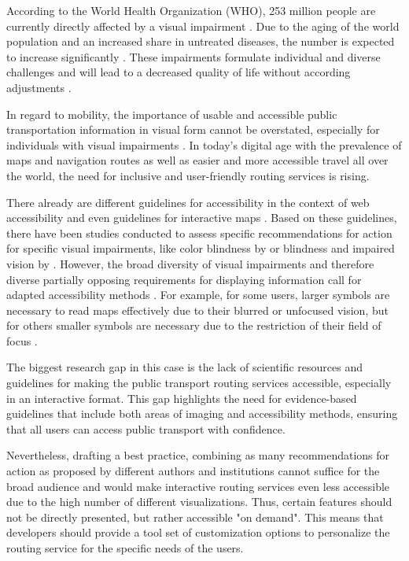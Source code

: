 \documentclass[agile, final]{copernicus-agile}
\begin{document}

\introduction[Introduction]

According to the World Health Organization (WHO), 253 million people are currently directly affected by a visual impairment \citep{WHO2023}. Due to the aging of the world population and an increased share in untreated diseases, the number is expected to increase significantly \citep{WHO2019}. These impairments formulate individual and diverse challenges and will lead to a decreased quality of life without according adjustments \citep{WHO2019}.

In regard to mobility, the importance of usable and accessible public transportation information in visual form cannot be overstated, especially for individuals with visual impairments \citep{EngelEA2022, NeuschmidEA2012, Sennekamp2022}. In today’s digital age with the prevalence of maps and navigation routes as well as easier and more accessible travel all over the world, the need for inclusive and user-friendly routing services is rising.

There already are different guidelines for accessibility in the context of web accessibility and even guidelines for interactive maps \citep{W3C2012, W3C2023, MinnesotaIT2023}. Based on these guidelines, there have been studies conducted to assess specific recommendations for action for specific visual impairments, like color blindness by \citet{JennyKelso2007} or blindness and impaired vision by \citet{EngelEA2022}. However, the broad diversity of visual impairments and therefore diverse partially opposing requirements for displaying information call for adapted accessibility methods \citep{NeuschmidEA2012}. For example, for some users, larger symbols are necessary to read maps effectively due to their blurred or unfocused vision, but for others smaller symbols are necessary due to the restriction of their field of focus \citep{NeuschmidEA2012}. 

The biggest research gap in this case is the lack of scientific resources and guidelines for making the public transport routing services accessible, especially in an interactive format. This gap highlights the need for evidence-based guidelines that include both areas of imaging and accessibility methods, ensuring that all users can access public transport with confidence.

Nevertheless, drafting a best practice, combining as many recommendations for action as proposed by different authors and institutions cannot suffice for the broad audience and would make interactive routing services even less accessible due to the high number of different visualizations. Thus, certain features should not be directly presented, but rather accessible "on demand". This means that developers should provide a tool set of customization options to personalize the routing service for the specific needs of the users. 
\end{document}
